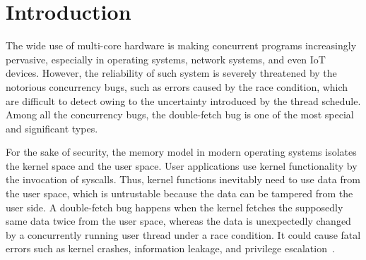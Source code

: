 \documentclass[10pt]{llncs}
\begin{document}
\section{Introduction}%
\label{intro}


The wide use of multi-core hardware is making concurrent programs increasingly pervasive, 
especially in operating systems, network systems, and even IoT devices. However, 
the reliability of such system is severely threatened by the notorious concurrency bugs, 
such as errors caused by the race condition, which are difficult to detect owing to the 
uncertainty introduced by the thread schedule. Among all the concurrency bugs, the double-fetch 
bug is one of the most special and significant types.


For the sake of security, the memory model in modern operating systems isolates the kernel space and 
the user space. User applications use kernel functionality by the invocation of syscalls. 
Thus, kernel functions inevitably need to use data from the user space, which is untrustable 
because the data can be tampered from the user side. A double-fetch bug happens when the 
kernel fetches the supposedly same data twice from the user space, whereas the data is 
unexpectedly changed by a concurrently running user thread under a race condition. 
It could cause fatal errors such as kernel crashes, information leakage, and privilege escalation~\cite{Wang2017A}. 
\end{document}
